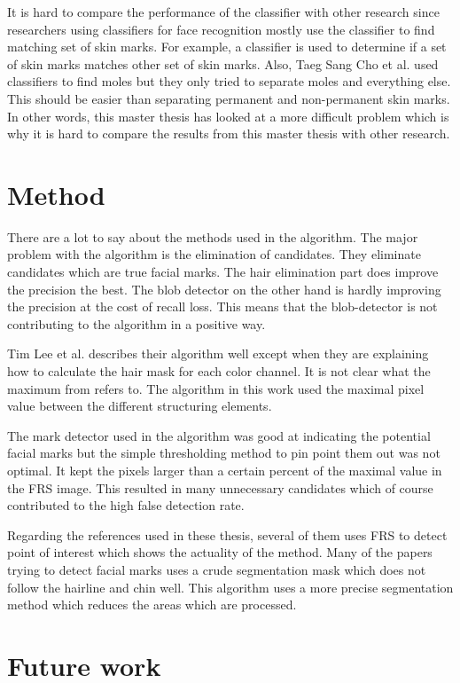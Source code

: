 It is hard to compare the performance of the classifier with other research since researchers using classifiers for face recognition mostly use the classifier to find matching set of skin marks. For example, a classifier is used to determine if a set of skin marks matches other set of skin marks. Also, Taeg Sang Cho et al. used classifiers to find moles but they only tried to separate moles and everything else. This should be easier than separating permanent and non-permanent skin marks. In other words, this master thesis has looked at a more difficult problem which is why it is hard to compare the results from this master thesis with other research. 


\section{Method}

There are a lot to say about the methods used in the algorithm. The major problem with the algorithm is the elimination of candidates. They eliminate candidates which are true facial marks. The hair elimination part does improve the precision the best. The blob detector on the other hand is hardly improving the precision at the cost of recall loss. This means that the blob-detector is not contributing to the algorithm in a positive way.

Tim Lee et al. describes their algorithm well except when they are explaining how to calculate the hair mask for each color channel. It is not clear what the maximum from refers to. The algorithm in this work used the maximal pixel value between the different structuring elements. 

The mark detector used in the algorithm was good at indicating the potential facial marks but the simple thresholding method to pin point them out was not optimal. It kept the pixels larger than a certain percent of the maximal value in the FRS image. This resulted in many unnecessary candidates which of course contributed to the high false detection rate. 

Regarding the references used in these thesis, several of them uses FRS to detect point of interest which shows the actuality of the method. Many of the papers trying to detect facial marks uses a crude segmentation mask which does not follow the hairline and chin well. This algorithm uses a more precise segmentation method which reduces the areas which are processed. 


\section{Future work}


